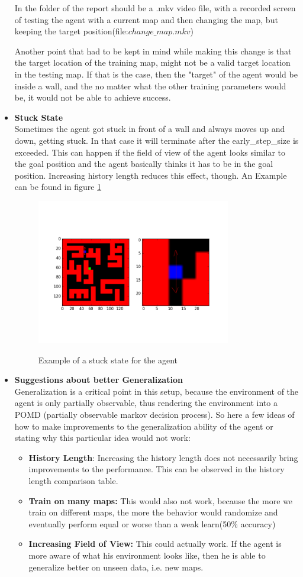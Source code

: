 \documentclass[a4paper]{article}
\begin{document}
\begin{itemize}
In the folder of the report should be a .mkv video file, with a recorded screen of testing the agent with a current map and then changing the map, but keeping the target position(file:$change\_map.mkv$)

Another point that had to be kept in mind while making this change is that the target location of the training map, might not be a valid target location in the testing map. If that is the case, then the "target" of the agent would be inside a wall, and the no matter what the other training parameters would be, it would not be able to achieve success.
\clearpage
\item \textbf{Stuck State}\\
Sometimes the agent got stuck in front of a wall and always moves up and down, getting stuck. In that case it will terminate after the early\_step\_size is exceeded. This can happen if the field of view of the agent looks similar to the goal position and the agent basically thinks it has to be in the goal position. Increasing history length reduces this effect, though. An Example can be found in figure \ref{fig:stuck_state}
\begin{figure}[hbpt!]
\centering
\includegraphics[width=0.8\textwidth, height=0.4\textwidth]{stuck_state.png}
\label{fig:stuck_state}
\caption{Example of a stuck state for the agent}
\end{figure}


\item \textbf{Suggestions about better Generalization}\\
Generalization is a critical point in this setup, because the environment of the agent is only partially observable, thus rendering the environment into a POMD (partially observable markov decision process). So here a few ideas of how to make improvements to the generalization ability of the agent or stating why this particular idea would not work:
\begin{itemize}
\item \textbf{History Length}: Increasing the history length does not necessarily bring improvements to the performance. This can be observed in the history length comparison table.
\item \textbf{Train on many maps:} This would also not work, because the more we train on different maps, the more the behavior would randomize and eventually perform equal or worse than a weak learn(50\% accuracy)
\item \textbf{Increasing Field of View:} This could actually work. If the agent is more aware of what his environment looks like, then he is able to generalize better on unseen data, i.e. new maps.


\end{itemize}
\end{itemize}
\end{document}
